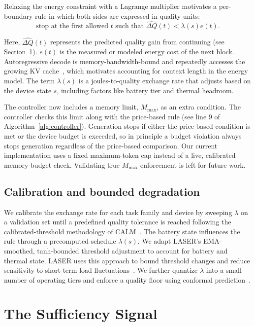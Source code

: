 \documentclass[review,12pt]{elsarticle}
\newcommand{\dq}{\widehat{\Delta Q}}
\begin{document}
Relaxing the energy constraint with a Lagrange multiplier motivates a
per-boundary rule in which both sides are expressed in quality units:
\begin{equation}
\label{eq:stoprule}
\text{stop at the first allowed } t
\text{ such that } \dq(t) < \lambda(s)e(t).
\end{equation}

Here, $\dq(t)$ represents the predicted quality gain from continuing
(see Section~\ref{sec:signal}).  $e(t)$ is the measured or modeled energy
cost of the next block. Autoregressive decode is memory-bandwidth-bound
and repeatedly accesses the growing KV cache~\cite{maliakel2025dvfs},
which motivates accounting for context length in the energy model. The term $\lambda(s)$ is a
joules-to-quality exchange rate that adjusts based on the device state $s$, including factors like battery tier and thermal headroom.

The controller now includes a memory limit, $M_{\text{max}}$, as an
extra condition. The controller checks this limit along with the
price-based rule (see line 9 of Algorithm~\ref{alg:controller}).
Generation stops if either the price-based condition is met or the
device budget is exceeded, so in principle a budget violation always
stops generation regardless of the price-based comparison. Our current
implementation uses a fixed maximum-token cap instead of a live,
calibrated memory-budget check. Validating true $M_{\max}$ enforcement
is left for future work.

\subsection{Calibration and bounded degradation}
We calibrate the exchange rate for each task family and device by sweeping  $\lambda$ on a validation set until a predefined quality tolerance is reached  following the calibrated-threshold methodology of CALM~\cite{schuster2022calm}. The battery state influences the rule through a precomputed schedule $\lambda(s)$. We adapt LASER's EMA-smoothed, tanh-bounded threshold adjustment to account for battery and thermal state. LASER uses this approach to bound threshold changes and reduce sensitivity to short-term load fluctuations~\cite{tang2026laser}. We further quantize $\lambda$ into a small number of operating tiers and enforce a quality floor using conformal prediction~\cite{vovk2005conformal}.  

\section{The Sufficiency Signal}
\label{sec:signal}
\end{document}
